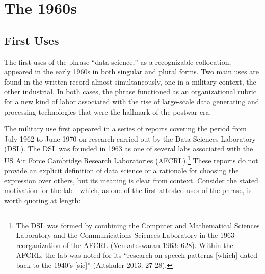 \documentclass[
  letterpaper,
]{report}
\begin{document}
\hypertarget{the-1960s}{%
\chapter{The 1960s}\label{the-1960s}}

\hypertarget{first-uses}{%
\section{First Uses}\label{first-uses}}

The first uses of the phrase ``data science,'' as a recognizable
collocation, appeared in the early 1960s in both singular and plural
forms. Two main uses are found in the written record almost
simultaneously, one in a military context, the other industrial. In both
cases, the phrase functioned as an organizational rubric for a new kind
of labor associated with the rise of large-scale data generating and
processing technologies that were the hallmark of the postwar era.

The military use first appeared in a series of reports covering the
period from July 1962 to June 1970 on research carried out by the Data
Sciences Laboratory (DSL). The DSL was founded in 1963 as one of several
labs associated with the US Air Force Cambridge Research Laboratories
(AFCRL).\footnote{The DSL was formed by combining the Computer and
  Mathematical Sciences Laboratory and the Communications Sciences
  Laboratory in the 1963 reorganization of the AFCRL (Venkateswaran
  1963: 628). Within the AFCRL, the lab was noted for its ``research on
  speech patterns {[}which{]} dated back to the 1940's {[}sic{]}''
  (Altshuler 2013: 27-28).} These reports do not provide an explicit
definition of data science or a rationale for choosing the expression
over others, but its meaning is clear from context. Consider the stated
motivation for the lab---which, as one of the first attested uses of the
phrase, is worth quoting at length:
\end{document}
